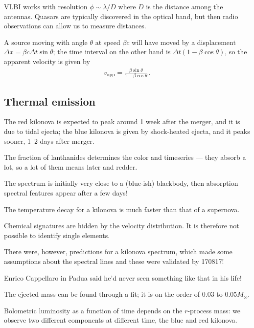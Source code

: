 \documentclass[main.tex]{subfiles}
\begin{document}

VLBI works with resolution \(\phi \sim \lambda / D\) where \(D\) is the distance among the 
antennas. 
Quasars are typically discovered in the optical band, but then 
radio observations can allow us to measure distances. 

A source moving with angle \(\theta \) at speed \(\beta c\) will have moved by a 
displacement \(\Delta x = \beta c \Delta t \sin \theta \); 
the time interval on the other hand is \(\Delta t (1 - \beta \cos \theta )\), so 
the apparent velocity is given by 
%
\begin{align}
v _{\text{app}} = \frac{\beta \sin \theta }{1 - \beta \cos \theta }
\,.
\end{align}

\subsection{Thermal emission}

The red kilonova is expected to peak around 1 week after the merger, 
and it is due to tidal ejecta; 
the blue kilonova is given by shock-heated ejecta, and it peaks sooner, 
1--2 days after merger.  

The fraction of lanthanides determines the color and timeseries --- 
they absorb a lot, so a lot of them means later and redder. 

The spectrum is initially very close to a (blue-ish) blackbody, 
then absorption spectral features appear after a few days! 

The temperature decay for a kilonova is much faster than 
that of a supernova. 

Chemical signatures are hidden by the velocity distribution. 
It is therefore not possible to identify single elements.

There were, however, predictions for a kilonova spectrum, 
which made some assumptions about the spectral lines and 
these were validated by 170817! 

Enrico Cappellaro in Padua said he'd never seen something like that in his life!

The ejected mass can be found through a fit; it is on the order of
0.03 to \(0.05 M_{\odot}\). 

Bolometric luminosity as a function of time 
depends on the \(r\)-process mass: 
we observe two different components at different time, the 
blue and red kilonova. 
\end{document}
